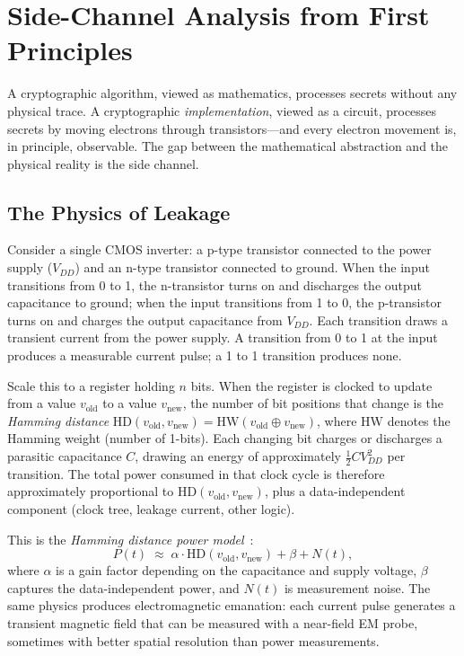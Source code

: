 \section{Side-Channel Analysis from First Principles}
\label{sec:sca-first-principles}

A cryptographic algorithm, viewed as mathematics, processes secrets without any physical trace.  A cryptographic \emph{implementation}, viewed as a circuit, processes secrets by moving electrons through transistors---and every electron movement is, in principle, observable.  The gap between the mathematical abstraction and the physical reality is the side channel.

\subsection{The Physics of Leakage}
\label{subsec:physics-leakage}

Consider a single CMOS inverter: a p-type transistor connected to the power supply ($V_{DD}$) and an n-type transistor connected to ground.  When the input transitions from 0 to 1, the n-transistor turns on and discharges the output capacitance to ground; when the input transitions from 1 to 0, the p-transistor turns on and charges the output capacitance from $V_{DD}$.  Each transition draws a transient current from the power supply.  A transition from 0 to 1 at the input produces a measurable current pulse; a 1 to 1 transition produces none.

Scale this to a register holding $n$ bits.  When the register is clocked to update from a value $v_{\text{old}}$ to a value $v_{\text{new}}$, the number of bit positions that change is the \emph{Hamming distance} $\text{HD}(v_{\text{old}}, v_{\text{new}}) = \text{HW}(v_{\text{old}} \oplus v_{\text{new}})$, where $\text{HW}$ denotes the Hamming weight (number of 1-bits).  Each changing bit charges or discharges a parasitic capacitance $C$, drawing an energy of approximately $\frac{1}{2}C V_{DD}^2$ per transition.  The total power consumed in that clock cycle is therefore approximately proportional to $\text{HD}(v_{\text{old}}, v_{\text{new}})$, plus a data-independent component (clock tree, leakage current, other logic).

This is the \emph{Hamming distance power model}~\cite{MangardOswaldPopp2007}:
\begin{equation}
\label{eq:hd-model}
P(t) \;\approx\; \alpha \cdot \text{HD}(v_{\text{old}}, v_{\text{new}}) + \beta + N(t),
\end{equation}
where $\alpha$ is a gain factor depending on the capacitance and supply voltage, $\beta$ captures the data-independent power, and $N(t)$ is measurement noise.  The same physics produces electromagnetic emanation: each current pulse generates a transient magnetic field that can be measured with a near-field EM probe, sometimes with better spatial resolution than power measurements.

